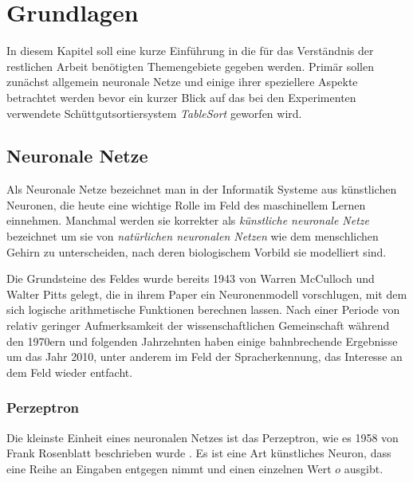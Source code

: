 \chapter{Grundlagen}




In diesem Kapitel soll eine kurze Einführung in die für das Verständnis der restlichen Arbeit benötigten Themengebiete gegeben werden.
Primär sollen zunächst allgemein neuronale Netze und einige ihrer speziellere Aspekte betrachtet werden 
bevor ein kurzer Blick auf das bei den Experimenten verwendete Schüttgutsortiersystem \textit{TableSort} geworfen wird. 

% 

\section{Neuronale Netze}

Als Neuronale Netze  %
bezeichnet man in der Informatik Systeme aus künstlichen Neuronen, die heute eine wichtige Rolle im Feld des maschinellem Lernen einnehmen.
Manchmal werden sie korrekter als \textit{künstliche neuronale Netze} bezeichnet um sie von \textit{natürlichen neuronalen Netzen} 
wie dem menschlichen Gehirn zu unterscheiden, nach deren biologischem Vorbild sie modelliert sind.

Die Grundsteine des Feldes wurde bereits 1943 von Warren McCulloch und Walter Pitts gelegt, 
die in ihrem Paper \cite{mcculloch1943logical} ein Neuronenmodell vorschlugen, mit dem sich logische arithmetische Funktionen berechnen lassen. 
Nach einer Periode von relativ geringer Aufmerksamkeit der wissenschaftlichen Gemeinschaft während den 1970ern und folgenden Jahrzehnten 
haben einige bahnbrechende Ergebnisse um das Jahr 2010, unter anderem im Feld der Spracherkennung, das Interesse an dem Feld wieder entfacht. 



\subsection{{Perzeptron}}
Die kleinste Einheit eines neuronalen Netzes ist das Perzeptron, wie es 1958 von Frank Rosenblatt beschrieben wurde \cite{rosenblatt1958perceptron}.
Es ist eine Art künstliches Neuron, dass eine Reihe an Eingaben entgegen nimmt und einen einzelnen Wert \(o\) ausgibt.

